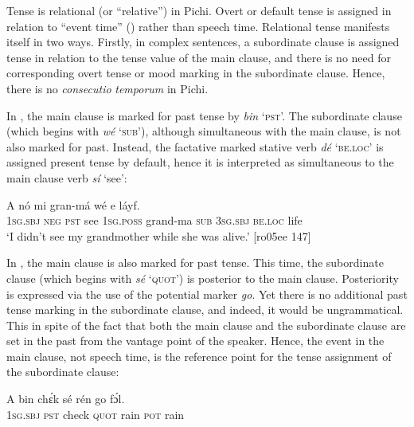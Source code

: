 Tense is relational (or “relative”) in Pichi. Overt or default tense is assigned in relation to “event time” (\citealt{ChungTimberlake1985}) rather than speech time. Relational tense manifests itself in two ways. Firstly, in complex sentences, a subordinate clause is assigned tense in relation to the tense value of the main clause, and there is no need for corresponding overt tense or mood marking in the subordinate clause. Hence, there is no \textit{consecutio} \textit{temporum} in Pichi.


In , the main clause is marked for past tense by \textit{bin} ‘\textsc{pst}’. The subordinate clause (which begins with \textit{wé} ‘\textsc{sub}’), although simultaneous with the main clause, is not also marked for past. Instead, the factative marked stative verb \textit{dé} \textsc{‘be.loc’} is assigned present tense by default, hence it is interpreted as simultaneous to the main clause verb \textit{sí} ‘see’: 



\ea%
    \label{ex:key:374}
    \gll \MakeUppercase{A}   nó      mi    gran-má    wé  e   láyf.\\
\textsc{1sg.sbj}  \textsc{neg}  \textsc{pst}  see  \textsc{1sg.poss}  grand-ma  \textsc{sub}  \textsc{3sg.sbj}  \textsc{be.loc}  life\\

\glt ‘I didn’t see my grandmother while she was alive.’ [ro05ee 147]
\z

In , the main clause is also marked for past tense. This time, the subordinate clause (which begins with \textit{sé} ‘\textsc{quot}’) is posterior to the main clause. Posteriority is expressed via the use of the potential marker \textit{go}. Yet there is no additional past tense marking in the subordinate clause, and indeed, it would be ungrammatical. This in spite of the fact that both the main clause and the subordinate clause are set in the past from the vantage point of the speaker. Hence, the event in the main clause, not speech time, is the reference point for the tense assignment of the subordinate clause:


\ea%
    \label{ex:key:375}
    \gll A    bin  chɛ́k  sé    rén  go  fɔ́l.\\
\textsc{1sg.sbj}  \textsc{pst}  check  \textsc{quot}    rain  \textsc{pot}  rain\\

